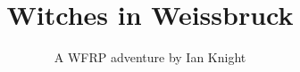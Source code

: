 \documentclass{wfrp}
\begin{document}
\title{Witches in Weissbruck}
\author{A WFRP adventure by Ian Knight}
\date{}
\maketitle

\tableofcontents



\end{document}
